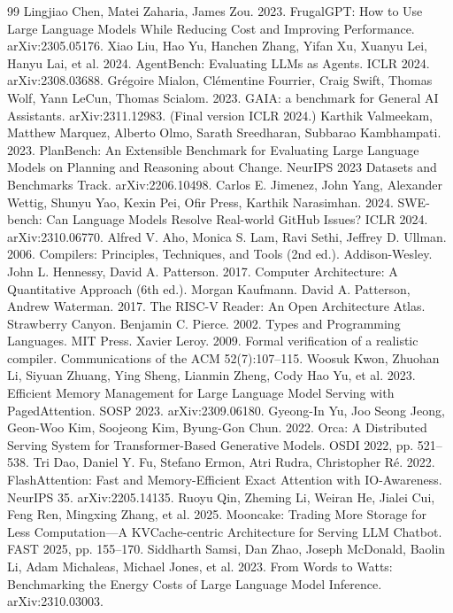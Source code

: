 \documentclass[
  sigconf,
  anonymous]{acmart}
\begin{document}
{\begin{thebibliography}{99}
 Lingjiao Chen, Matei Zaharia, James Zou. 2023. FrugalGPT: How to Use Large Language Models While Reducing Cost and Improving Performance. arXiv:2305.05176.
 Xiao Liu, Hao Yu, Hanchen Zhang, Yifan Xu, Xuanyu Lei, Hanyu Lai, et al. 2024. AgentBench: Evaluating LLMs as Agents. ICLR 2024. arXiv:2308.03688.
 Grégoire Mialon, Clémentine Fourrier, Craig Swift, Thomas Wolf, Yann LeCun, Thomas Scialom. 2023. GAIA: a benchmark for General AI Assistants. arXiv:2311.12983. (Final version ICLR 2024.)
 Karthik Valmeekam, Matthew Marquez, Alberto Olmo, Sarath Sreedharan, Subbarao Kambhampati. 2023. PlanBench: An Extensible Benchmark for Evaluating Large Language Models on Planning and Reasoning about Change. NeurIPS 2023 Datasets and Benchmarks Track. arXiv:2206.10498.
 Carlos E. Jimenez, John Yang, Alexander Wettig, Shunyu Yao, Kexin Pei, Ofir Press, Karthik Narasimhan. 2024. SWE-bench: Can Language Models Resolve Real-world GitHub Issues? ICLR 2024. arXiv:2310.06770.
 Alfred V. Aho, Monica S. Lam, Ravi Sethi, Jeffrey D. Ullman. 2006. Compilers: Principles, Techniques, and Tools (2nd ed.). Addison-Wesley.
 John L. Hennessy, David A. Patterson. 2017. Computer Architecture: A Quantitative Approach (6th ed.). Morgan Kaufmann.
 David A. Patterson, Andrew Waterman. 2017. The RISC-V Reader: An Open Architecture Atlas. Strawberry Canyon.
 Benjamin C. Pierce. 2002. Types and Programming Languages. MIT Press.
 Xavier Leroy. 2009. Formal verification of a realistic compiler. Communications of the ACM 52(7):107–115.
 Woosuk Kwon, Zhuohan Li, Siyuan Zhuang, Ying Sheng, Lianmin Zheng, Cody Hao Yu, et al. 2023. Efficient Memory Management for Large Language Model Serving with PagedAttention. SOSP 2023. arXiv:2309.06180.
 Gyeong-In Yu, Joo Seong Jeong, Geon-Woo Kim, Soojeong Kim, Byung-Gon Chun. 2022. Orca: A Distributed Serving System for Transformer-Based Generative Models. OSDI 2022, pp. 521–538.
 Tri Dao, Daniel Y. Fu, Stefano Ermon, Atri Rudra, Christopher Ré. 2022. FlashAttention: Fast and Memory-Efficient Exact Attention with IO-Awareness. NeurIPS 35. arXiv:2205.14135.
 Ruoyu Qin, Zheming Li, Weiran He, Jialei Cui, Feng Ren, Mingxing Zhang, et al. 2025. Mooncake: Trading More Storage for Less Computation—A KVCache-centric Architecture for Serving LLM Chatbot. FAST 2025, pp. 155–170.
 Siddharth Samsi, Dan Zhao, Joseph McDonald, Baolin Li, Adam Michaleas, Michael Jones, et al. 2023. From Words to Watts: Benchmarking the Energy Costs of Large Language Model Inference. arXiv:2310.03003.

\end{thebibliography}}
\end{document}
